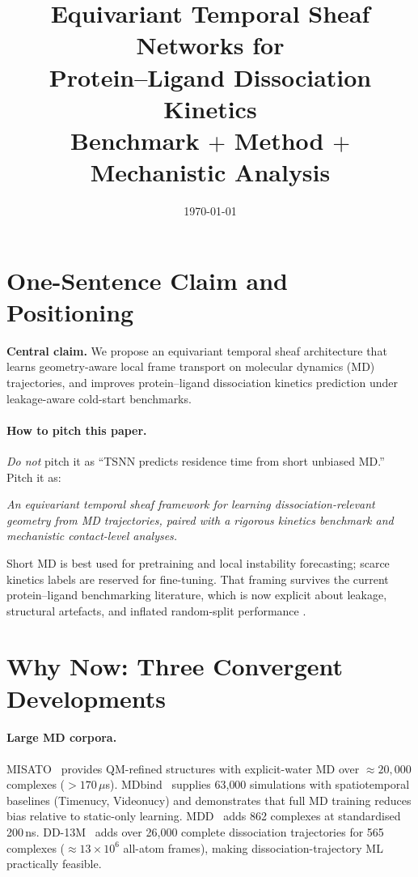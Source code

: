\documentclass[12pt,a4paper]{article}
\title{%
  \textbf{Equivariant Temporal Sheaf Networks for\\
  Protein--Ligand Dissociation Kinetics}\\[6pt]
  \normalsize Benchmark $+$ Method $+$ Mechanistic Analysis
}
\author{}
\date{\today}
\begin{document}
\maketitle
\tableofcontents
\clearpage

\section{One-Sentence Claim and Positioning}
\label{sec:claim}

\begin{claimbox}
\textbf{Central claim.}
We propose an equivariant temporal sheaf architecture that learns
geometry-aware local frame transport on molecular dynamics (MD) trajectories,
and improves protein--ligand dissociation kinetics prediction under
leakage-aware cold-start benchmarks.
\end{claimbox}

\paragraph{How to pitch this paper.}
\emph{Do not} pitch it as ``TSNN predicts residence time from short unbiased
MD.'' Pitch it as:

\begin{claimbox}
\centering
\textit{An equivariant temporal sheaf framework for learning
dissociation-relevant geometry from MD trajectories, paired with a rigorous
kinetics benchmark and mechanistic contact-level analyses.}
\end{claimbox}

Short MD is best used for pretraining and local instability forecasting;
scarce kinetics labels are reserved for fine-tuning.
That framing survives the current protein--ligand benchmarking literature,
which is now explicit about leakage, structural artefacts, and inflated
random-split performance
\citep{plinder2024,hiqbind2025,cleansplit2025,leakproofpdbbind2024}.

\section{Why Now: Three Convergent Developments}
\label{sec:why}

\paragraph{Large MD corpora.}
MISATO~\citep{misato2024} provides QM-refined structures with explicit-water
MD over ${\approx}20{,}000$ complexes ($>170\,\mu$s).
MDbind~\citep{mdbind2025} supplies 63{,}000 simulations with spatiotemporal
baselines (Timenucy, Videonucy) and demonstrates that full MD training reduces
bias relative to static-only learning.
MDD~\citep{mdd2024} adds 862 complexes at standardised 200\,ns.
DD-13M~\citep{dd13m2025} adds over 26{,}000 complete dissociation trajectories
for 565 complexes (${\approx}13\times10^6$ all-atom frames), making
dissociation-trajectory ML practically feasible.
\end{document}
